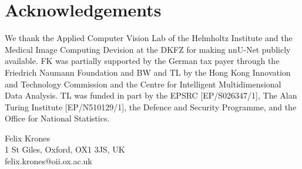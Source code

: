 \documentclass[twocolumn]{cinc}
\begin{document}
\section*{Acknowledgements}  
We thank the Applied Computer Vision Lab of the Helmholtz Institute and the Medical Image Computing Devision at the DKFZ for making nnU-Net publicly available. FK was partially supported by the German tax payer through the Friedrich Naumann Foundation and BW and TL by the Hong Kong Innovation and Technology Commission and the Centre for Intelligent Multidimensional Data Analysis. TL was funded in part by the EPSRC [EP/S026347/1], The Alan Turing Institute [EP/N510129/1], the Defence and Security Programme, and the Office for National Statistics. 











\begin{correspondence}
Felix Krones\\
1 St Giles, Oxford, OX1 3JS, UK\\
felix.krones@oii.ox.ac.uk
\end{correspondence}
\end{document}
